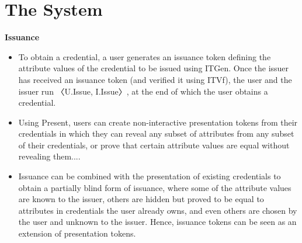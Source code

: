 \newcommand{\user}{\mathsf{U}}
\newcommand{\uri}{\mathsf{URI}}
\newcommand{\expiry}{\mathsf{exp}}
\newcommand{\idp}{\mathsf{IDP}}
\newcommand{\ra}{\mathsf{RA}}
\newcommand{\cp}{\mathsf{CP}}
\newcommand{\rpk}{\mathsf{rpk}}
\newcommand{\rsk}{\mathsf{rsk}}
\newcommand{\dsk}{\mathsf{dsk}}
\newcommand{\apk}{\mathsf{apk}}
\newcommand{\ask}{\mathsf{ask}}
\newcommand{\rai}{\mathsf{rai}}
\newcommand{\cci}{\mathsf{cci}}
\newcommand{\wpid}{\mathsf{w_{pid}}}
\newcommand{\wctx}{\mathsf{w_{ctx}}}
\newcommand{\ri}{\mathsf{ri}}
\newcommand{\s}{\mathsf{s}}
\newcommand{\acc}{\mathsf{acc}}
\newcommand{\attrs}{\mathsf{attrs}}
\newcommand{\precred}{\mathsf{precred}}
\newcommand{\escrow}{\mathsf{escrow}}
\newcommand{\audit}{\mathsf{AUD}}
\newcommand{\rely}{\mathsf{REL}}

\newcommand{\ul}{\mathsf{UL}}
\newcommand{\ctxl}{\mathsf{CTXL}}



\newcommand{\ctxid}{\mathsf{ctx}_{id}}
\newcommand{\cpid}{\mathsf{CP}_{id}}


\newcommand{\cmcom}{\mathsf{CM.Com}}
\newcommand{\cmopen}{\mathsf{CM.Open}}


\newcommand{\ibekg}{\mathsf{IBE.KeyGen}}
\newcommand{\ibeextract}{\mathsf{IBE.Extract}}
\newcommand{\ibeenc}{\mathsf{IBE.Enc}}
\newcommand{\ibedec}{\mathsf{IBE.Dec}}

\newcommand{\tpkeenc}{\mathsf{TPKE.Enc}}
\newcommand{\tpkdec}{\mathsf{TPKE.Dec}}

\newcommand{\psrerand}{\mathsf{PS.Rerand}}
\newcommand{\psverify}{\mathsf{PS.Verify}}

\newcommand{\vrfgen}{\mathsf{PRF.Gen}}
\newcommand{\vrfprove}{\mathsf{PRF.Prove}}
\newcommand{\vrfverify}{\mathsf{PRF.Verify}}

\section{The System}
\textbf{Issuance}
\begin{itemize}
    \item To obtain a credential, a user generates an issuance token defining the attribute values of the credential to be issued using ITGen. Once the issuer has received an issuance token (and verified it using ITVf), the user and the issuer run 〈U.Issue, I.Issue〉, at the end of which the user obtains a credential.
    \item Using Present, users can create non-interactive presentation tokens from their credentials in which they can reveal any subset of attributes from any subset of their credentials, or prove that certain attribute values are equal without revealing them....
    \item Issuance can be combined with the presentation of existing credentials to obtain a partially blind form of issuance, where some of the attribute values are known to the issuer, others are hidden but proved to be equal to attributes in credentials the user already owns, and even others are chosen by the user and unknown to the issuer. Hence, issuance tokens can be seen as an extension of presentation tokens.
\end{itemize}



